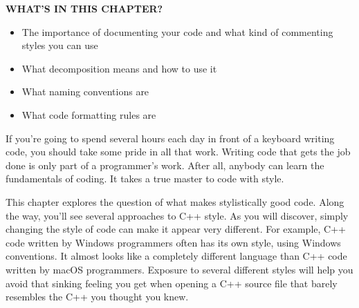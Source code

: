 \noindent
\textbf{WHAT’S IN THIS CHAPTER?}

\begin{itemize}
\item
The importance of documenting your code and what kind of commenting styles you can use

\item
What decomposition means and how to use it

\item
What naming conventions are

\item
What code formatting rules are
\end{itemize}

If you’re going to spend several hours each day in front of a keyboard writing code, you should take some pride in all that work. Writing code that gets the job done is only part of a programmer’s work. After all, anybody can learn the fundamentals of coding. It takes a true master to code with style.

This chapter explores the question of what makes stylistically good code. Along the way, you’ll see several approaches to C++ style. As you will discover, simply changing the style of code can make it appear very different. For example, C++ code written by Windows programmers often has its own style, using Windows conventions. It almost looks like a completely different language than C++ code written by macOS programmers. Exposure to several different styles will help you avoid that sinking feeling you get when opening a C++ source file that barely resembles the C++ you thought you knew.
